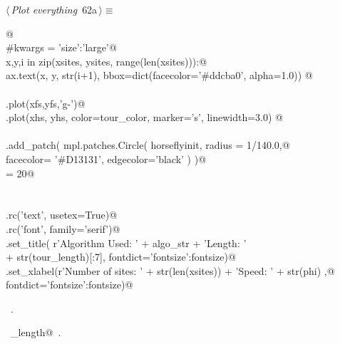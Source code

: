\documentclass[11.5pt]{report}
\begin{document}
\vspace{-0.8cm} \newchunk
\begin{flushleft} \small
\begin{minipage}{\linewidth}\label{scrap89}\raggedright\small
{} $\langle\,${\itshape Plot everything}\nobreak\ {\footnotesize {62a}}$\,\rangle\equiv$
\vspace{-1ex}
\begin{list}{}{} \item
\mbox{}\verb@ @\\
\mbox{}\verb@#kwargs = {'size':'large'}@\\
\mbox{}\verb@for x,y,i in zip(xsites, ysites, range(len(xsites))):@\\
\mbox{}\verb@    ax.text(x, y, str(i+1), bbox=dict(facecolor='#ddcba0', alpha=1.0)) @\\
\mbox{}\verb@@\\
\mbox{}\verb@ax.plot(xfs,yfs,'g-')@\\
\mbox{}\verb@ax.plot(xhs, yhs, color=tour_color, marker='s', linewidth=3.0) @\\
\mbox{}\verb@@\\
\mbox{}\verb@ax.add_patch( mpl.patches.Circle( horseflyinit, radius = 1/140.0,@\\
\mbox{}\verb@                                  facecolor= '#D13131', edgecolor='black'   )  )@\\
\mbox{}\verb@fontsize = 20@\\
\mbox{}\verb@@\\
\mbox{}\verb@@\\
\mbox{}\verb@plt.rc('text', usetex=True)@\\
\mbox{}\verb@plt.rc('font', family='serif')@\\
\mbox{}\verb@ax.set_title( r'Algorithm Used: ' + algo_str +  '\nTour Length: ' \@\\
\mbox{}\verb@               + str(tour_length)[:7], fontdict={'fontsize':fontsize})@\\
\mbox{}\verb@ax.set_xlabel(r'Number of sites: ' + str(len(xsites)) + '\nDrone Speed: ' + str(phi) ,@\\
\mbox{}\verb@                  fontdict={'fontsize':fontsize})@\\
\mbox{}\verb@@{\NWsep}
\end{list}
\vspace{-1.5ex}
\footnotesize
\begin{list}{}{\setlength{\itemsep}{-\parsep}\setlength{\itemindent}{-\leftmargin}}
\item \NWtxtMacroRefIn\ .
\item \NWtxtIdentsUsed\nobreak\  \verb@tour_length@\nobreak\ .
\item{}
\end{list}
\end{minipage}\vspace{4ex}
\end{flushleft}
\end{document}
